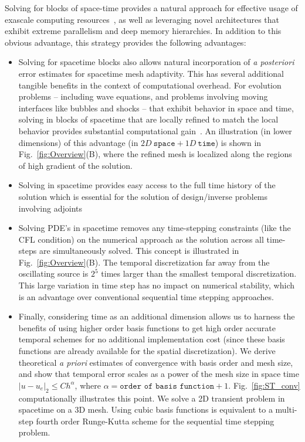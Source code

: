 Solving for blocks of space-time provides a natural approach for effective usage of exascale computing resources~\cite{siam2013}, as well as leveraging novel architectures that exhibit extreme parallelism and deep memory hierarchies. In addition to this obvious advantage, this strategy provides the following advantages:
\begin{itemize}%
    \item Solving for spacetime blocks also allows natural incorporation of {\it a posteriori} error estimates for spacetime mesh adaptivity. This has several additional tangible benefits in the context of computational overhead. For evolution problems -- including wave equations, and problems involving moving interfaces like bubbles and shocks -- that exhibit  behavior in space and time, solving in blocks of spacetime that are locally refined to match the local behavior provides substantial computational gain~\cite{carey_estep}. An illustration (in lower dimensions) of this advantage (in $2D~\texttt{space} + 1D ~\texttt{time}$) is shown in Fig.~\ref{fig:Overview}(B), where the refined mesh is localized along the regions of high gradient of the solution.
    \item Solving in spacetime provides easy access to the full time history of the solution which is essential for the solution of design/inverse problems involving adjoints~\cite{Baskar1,Baskar2}
    \item Solving PDE's in spacetime removes any time-stepping constraints (like the CFL condition) on the numerical approach as the solution across all time-steps are simultaneously solved. This concept is illustrated in Fig.~\ref{fig:Overview}(B). The temporal discretization far away from the oscillating source is $2^5$ times larger than the smallest temporal discretization. This large variation in time step has no impact on numerical stability, which is an advantage over conventional sequential time stepping approaches.
    \item Finally, considering time as an additional dimension allows us to harness the benefits of using higher order basis functions to get high order accurate temporal schemes for no additional implementation cost (since these basis functions are already available for the spatial discretization). We derive theoretical {\it a priori} estimates of convergence with basis order and mesh size, and show that temporal error scales as a power of the mesh size in space time $|u - u_e|_2 \leq Ch^{\alpha}$, where $\alpha = \texttt{order of basis function} + 1$. Fig.~\ref{fig:ST_conv} computationally illustrates this point. We solve a 2D transient problem in spacetime on a 3D mesh. Using cubic basis functions is equivalent to a multi-step fourth order Runge-Kutta scheme for the sequential time stepping problem. 
\end{itemize}

